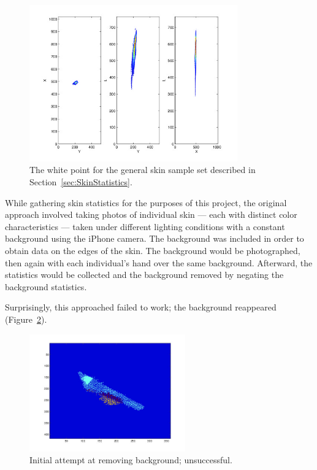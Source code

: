 \begin{figure}[h!]
  \centering
    \includegraphics[width=0.80\textwidth]{Chapter3/Figs/lxy_general_white_point.jpg}
    \caption{The white point for the general skin sample set described in Section~\ref{sec:SkinStatistics}.}  \label{fig:WhitePoint}
\end{figure}

While gathering skin statistics for the purposes of this project, the original approach involved taking photos of individual skin --- each with distinct color characteristics --- taken under different lighting conditions with a constant background using the iPhone camera. The background was included in order to obtain data on the edges of the skin. The background would be photographed, then again with each individual's hand over the same background. Afterward, the statistics would be collected and the background removed by negating the background statistics.

Surprisingly, this approached failed to work; the background reappeared (Figure~\ref{fig:BGFailure}).

\begin{figure}[h!]
  \centering
    \includegraphics[width=0.60\textwidth]{Chapter3/Figs/xy_bg_failed.jpg}
    \caption{Initial attempt at removing background; unsuccessful.} \label{fig:BGFailure}
\end{figure}

